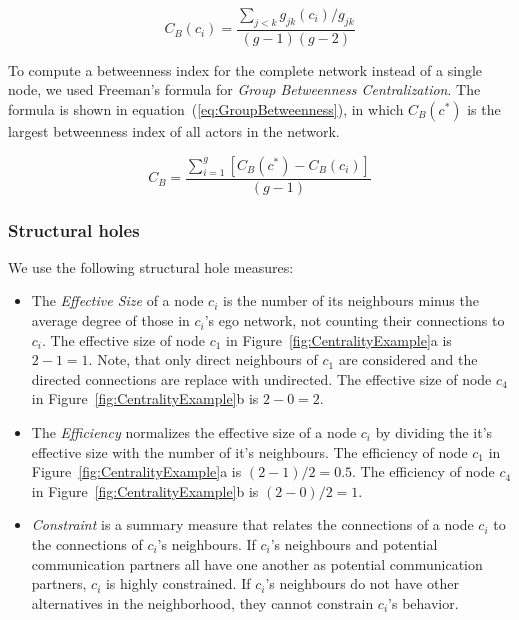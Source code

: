 \begin{equation}
\displaystyle C_B(c_i) =  \frac{\sum_{j<k} g_{jk}(c_i)/g_{jk}}{(g-1)(g-2)}
\label{eq:Betweenness}
\end{equation}

To compute a betweenness index for the complete network instead of a single node,
we used Freeman's formula for \emph{Group Betweenness Centralization}. The
formula is shown in equation~(\ref{eq:GroupBetweenness}), in which $C_B(c^*)$ is
the largest betweenness index of all actors in the network.

\begin{equation}
\displaystyle C_B =  \frac{\sum_{i=1}^g[C_B(c^*)-C_B(c_i)]}{(g-1)}
\label{eq:GroupBetweenness}
\end{equation}


\subsubsection{Structural holes}
We use the following structural hole measures:
\begin{itemize}
  \item The \emph{Effective Size} of a node $c_i$ is the number of its
  neighbours minus the average degree of those in $c_i$'s ego network, not
  counting their connections to $c_i$. The effective size of node $c_1$ in 
  Figure~\ref{fig:CentralityExample}a is $2-1=1$. Note, that only direct
  neighbours of $c_1$ are considered and the directed connections are replace
  with undirected. The effective size of node $c_4$ in 
  Figure~\ref{fig:CentralityExample}b is $2-0=2$.
  
  \item The \emph{Efficiency} normalizes the effective size of a node $c_i$ by
  dividing the it's effective size with the number of it's neighbours. The
  efficiency of node $c_1$ in Figure~\ref{fig:CentralityExample}a is
  $(2-1)/2=0.5$. The efficiency of node $c_4$ in
  Figure~\ref{fig:CentralityExample}b is $(2-0)/2=1$.
  
  \item \emph{Constraint} is a summary measure that relates the connections of a
  node $c_i$ to the connections of $c_i$'s neighbours. If $c_i$'s neighbours and
  potential communication partners all have one another as potential communication
  partners, $c_i$ is highly constrained. If $c_i$'s neighbours do not have other
  alternatives in the neighborhood, they cannot constrain $c_i$'s behavior. 
\end{itemize}

